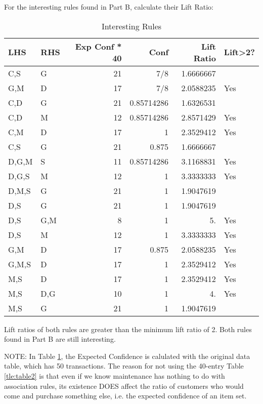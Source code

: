 \documentclass[10pt]{article}
\begin{document}
For the interesting rules found in Part B, calculate their Lift Ratio:
\begin{table}[htb]
\caption{\label{tbl:intrules}Interesting Rules}
\begin{center}
\begin{tabular}{llrrrl}
 LHS    &  RHS  &  Exp Conf * 40  &        Conf  &  Lift Ratio  &  Lift>2?  \\
\hline
 C,S    &  G    &             21  &         7/8  &   1.6666667  &           \\
 G,M    &  D    &             17  &         7/8  &   2.0588235  &  Yes      \\
 C,D    &  G    &             21  &  0.85714286  &   1.6326531  &           \\
 C,D    &  M    &             12  &  0.85714286  &   2.8571429  &  Yes      \\
 C,M    &  D    &             17  &           1  &   2.3529412  &  Yes      \\
 C,S    &  G    &             21  &       0.875  &   1.6666667  &           \\
 D,G,M  &  S    &             11  &  0.85714286  &   3.1168831  &  Yes      \\
 D,G,S  &  M    &             12  &           1  &   3.3333333  &  Yes      \\
 D,M,S  &  G    &             21  &           1  &   1.9047619  &           \\
 D,S    &  G    &             21  &           1  &   1.9047619  &           \\
 D,S    &  G,M  &              8  &           1  &          5.  &  Yes      \\
 D,S    &  M    &             12  &           1  &   3.3333333  &  Yes      \\
 G,M    &  D    &             17  &       0.875  &   2.0588235  &  Yes      \\
 G,M,S  &  D    &             17  &           1  &   2.3529412  &  Yes      \\
 M,S    &  D    &             17  &           1  &   2.3529412  &  Yes      \\
 M,S    &  D,G  &             10  &           1  &          4.  &  Yes      \\
 M,S    &  G    &             21  &           1  &   1.9047619  &           \\
\end{tabular}
\end{center}
\end{table}



Lift ratios of both rules are greater than the minimum lift ratio of 2. Both rules found in Part B are still interesting.

NOTE: In Table \ref{tbl:intrules}, the Expected Confidence is calulated with the original data table, which has 50 transactions. The reason for not using the 40-entry Table \ref{tle:table2} is that even if we know maintenance has nothing to do with association rules, its existence DOES affect the ratio of customers who would come and purchase something else, i.e. the expected confidence of an item set.
\end{document}
